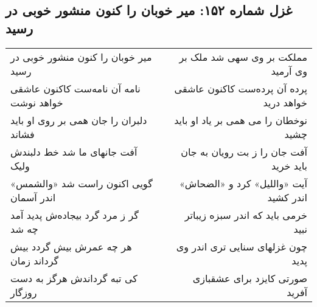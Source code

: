 \begin{center}
\section*{غزل شماره ۱۵۲: میر خوبان را کنون منشور خوبی در رسید}
\label{sec:152}
\begin{longtable}{l p{0.5cm} r}
میر خوبان را کنون منشور خوبی در رسید
&&
مملکت بر وی سهی شد ملک بر وی آرمید
\\
نامه آن نامه‌ست کاکنون عاشقی خواهد نوشت
&&
پرده آن پرده‌ست کاکنون عاشقی خواهد درید
\\
دلبران را جان همی بر روی او باید فشاند
&&
نوخطان را می همی بر یاد او باید چشید
\\
آفت جانهای ما شد خط دلبندش ولیک
&&
آفت جان را ز بت رویان به جان باید خرید
\\
گویی اکنون راست شد «والشمس» اندر آسمان
&&
آیت «واللیل» کرد و «الضحاش» اندر کشید
\\
گر ز مرد گرد بیجاده‌ش پدید آمد چه شد
&&
خرمی باید که اندر سبزه زیباتر نبید
\\
هر چه عمرش بیش گردد بیش گرداند زمان
&&
چون غزلهای سنایی تری اندر وی پدید
\\
کی تبه گرداندش هرگز به دست روزگار
&&
صورتی کایزد برای عشقبازی آفرید
\\
\end{longtable}
\end{center}
